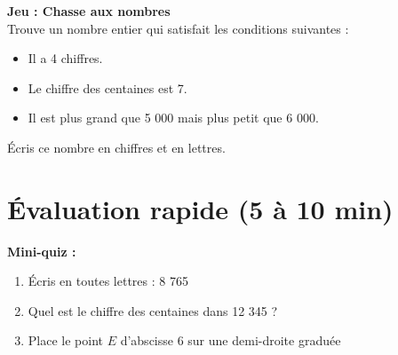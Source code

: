 \begin{jeubox}
  \textbf{Jeu : Chasse aux nombres} \\
  Trouve un nombre entier qui satisfait les conditions suivantes :
  \begin{itemize}
    \item Il a 4 chiffres.
    \item Le chiffre des centaines est 7.
    \item Il est plus grand que 5 000 mais plus petit que 6 000.
  \end{itemize}
  Écris ce nombre en chiffres et en lettres.
\end{jeubox}

\section{Évaluation rapide (5 à 10 min)}

\begin{exercisebox}
  \textbf{Mini-quiz :}
  \begin{enumerate}
    \item Écris en toutes lettres : 8 765
    \item Quel est le chiffre des centaines dans 12 345 ?
    \item Place le point $E$ d'abscisse 6 sur une demi-droite graduée
  \end{enumerate}
\end{exercisebox}